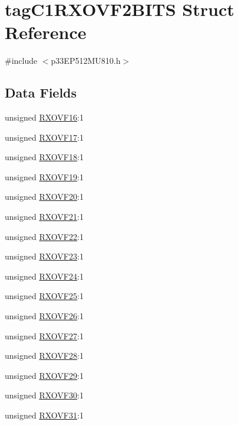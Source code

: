 \hypertarget{structtag_c1_r_x_o_v_f2_b_i_t_s}{}\section{tag\+C1\+R\+X\+O\+V\+F2\+B\+I\+TS Struct Reference}
\label{structtag_c1_r_x_o_v_f2_b_i_t_s}


{\ttfamily \#include $<$p33\+E\+P512\+M\+U810.\+h$>$}

\subsection*{Data Fields}
\begin{DoxyCompactItemize}
\item 
unsigned \hyperlink{structtag_c1_r_x_o_v_f2_b_i_t_s_a342c8863cc175b0dc4384e5edef918e6}{R\+X\+O\+V\+F16}\+:1
\item 
unsigned \hyperlink{structtag_c1_r_x_o_v_f2_b_i_t_s_a3cf20112bcf9044f2755a3ff3d54e476}{R\+X\+O\+V\+F17}\+:1
\item 
unsigned \hyperlink{structtag_c1_r_x_o_v_f2_b_i_t_s_a1911a4f43dc30c45e6ca4081bca0aee8}{R\+X\+O\+V\+F18}\+:1
\item 
unsigned \hyperlink{structtag_c1_r_x_o_v_f2_b_i_t_s_a4acf84e4adae1b4ee453194e4472a85f}{R\+X\+O\+V\+F19}\+:1
\item 
unsigned \hyperlink{structtag_c1_r_x_o_v_f2_b_i_t_s_a3648d446cd4eaaae895965ff05738d67}{R\+X\+O\+V\+F20}\+:1
\item 
unsigned \hyperlink{structtag_c1_r_x_o_v_f2_b_i_t_s_abaf88b869ba52046f953845c4d69cf0c}{R\+X\+O\+V\+F21}\+:1
\item 
unsigned \hyperlink{structtag_c1_r_x_o_v_f2_b_i_t_s_a668730c2840a2189723eff5377ff5e62}{R\+X\+O\+V\+F22}\+:1
\item 
unsigned \hyperlink{structtag_c1_r_x_o_v_f2_b_i_t_s_a83eedc147f0c997ccfdb501eee362265}{R\+X\+O\+V\+F23}\+:1
\item 
unsigned \hyperlink{structtag_c1_r_x_o_v_f2_b_i_t_s_a45aa631724dada46e3eb66a9b1505988}{R\+X\+O\+V\+F24}\+:1
\item 
unsigned \hyperlink{structtag_c1_r_x_o_v_f2_b_i_t_s_a72be421e0ad6e156da7ca671c4144498}{R\+X\+O\+V\+F25}\+:1
\item 
unsigned \hyperlink{structtag_c1_r_x_o_v_f2_b_i_t_s_a0e60593dd437fbeb9a6bc7b5aa0f567f}{R\+X\+O\+V\+F26}\+:1
\item 
unsigned \hyperlink{structtag_c1_r_x_o_v_f2_b_i_t_s_acdd1e4c715ed66c4763ee1e00cbffd13}{R\+X\+O\+V\+F27}\+:1
\item 
unsigned \hyperlink{structtag_c1_r_x_o_v_f2_b_i_t_s_ab9f3b8cd1d167c33e712b7af671d01c8}{R\+X\+O\+V\+F28}\+:1
\item 
unsigned \hyperlink{structtag_c1_r_x_o_v_f2_b_i_t_s_ad5944b9e23da912bbc3d36516e069211}{R\+X\+O\+V\+F29}\+:1
\item 
unsigned \hyperlink{structtag_c1_r_x_o_v_f2_b_i_t_s_a62c48cecd0d14e2dae174a5cc4dc96c5}{R\+X\+O\+V\+F30}\+:1
\item 
unsigned \hyperlink{structtag_c1_r_x_o_v_f2_b_i_t_s_ae24786af6ff63cf100fe8ebaabef7a74}{R\+X\+O\+V\+F31}\+:1
\end{DoxyCompactItemize}


